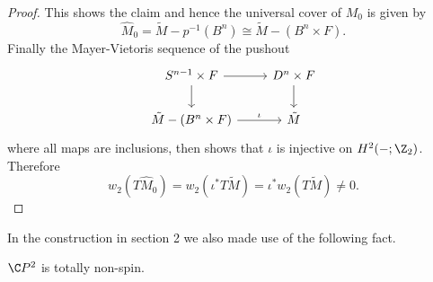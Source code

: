 \begin{proof}
    This shows the claim and hence the universal cover of $M_0$ is given by 
    \[
    \hat{M}_0 = \tilde{M} - p^{-1}(B^n) \cong \tilde{M} - (B^n \times F).
    \]
    Finally the Mayer-Vietoris sequence of the pushout 
    \[\begin{tikzcd}
	{S^{n-1} \times F} & {D^n \times F} \\
	{\tilde{M} - (B^n \times F)} & {\tilde{M}}
	\arrow[from=1-1, to=1-2]
	\arrow[from=1-1, to=2-1]
	\arrow[from=1-2, to=2-2]
	\arrow["\iota", from=2-1, to=2-2]
    \end{tikzcd}\]
    where all maps are inclusions, then shows that $\iota$ is injective on $H^2(-;\Z_2)$. Therefore
    \[
    w_2(T\hat{M}_0) = w_2(\iota^\ast T\tilde{M}) = \iota^\ast w_2(T\tilde{M}) \neq 0.
    \]
\end{proof}

In the construction in section 2 we also made use of the following fact.

\begin{lemma} \label{lem:cp2_not_spin}
    $\C P^2$ is totally non-spin.
\end{lemma}